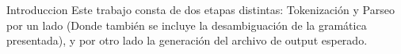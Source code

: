 \begin{section}{Introduccion}
Este trabajo consta de dos etapas distintas: Tokenizaci\'on y Parseo por un lado (Donde tambi\'en se incluye la desambiguaci\'on de la gram\'atica presentada), y por otro lado la generaci\'on del archivo de output esperado.

\end{section}
